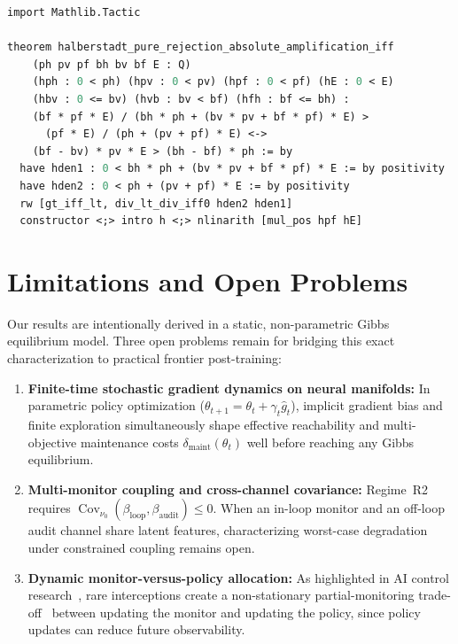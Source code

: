 \documentclass[11pt,a4paper]{article}
\newcommand{\Cov}{\operatorname{Cov}}
\begin{document}
\begin{lstlisting}[language=ML]
import Mathlib.Tactic

theorem halberstadt_pure_rejection_absolute_amplification_iff
    (ph pv pf bh bv bf E : Q)
    (hph : 0 < ph) (hpv : 0 < pv) (hpf : 0 < pf) (hE : 0 < E)
    (hbv : 0 <= bv) (hvb : bv < bf) (hfh : bf <= bh) :
    (bf * pf * E) / (bh * ph + (bv * pv + bf * pf) * E) >
      (pf * E) / (ph + (pv + pf) * E) <->
    (bf - bv) * pv * E > (bh - bf) * ph := by
  have hden1 : 0 < bh * ph + (bv * pv + bf * pf) * E := by positivity
  have hden2 : 0 < ph + (pv + pf) * E := by positivity
  rw [gt_iff_lt, div_lt_div_iff0 hden2 hden1]
  constructor <;> intro h <;> nlinarith [mul_pos hpf hE]
\end{lstlisting}

\section{Limitations and Open Problems}

Our results are intentionally derived in a static, non-parametric Gibbs equilibrium model. Three open problems remain for bridging this exact characterization to practical frontier post-training:
\begin{enumerate}
  \item \textbf{Finite-time stochastic gradient dynamics on neural manifolds:} In parametric policy optimization ($\theta_{t+1} = \theta_t + \gamma_t \hat{g}_t$), implicit gradient bias and finite exploration simultaneously shape effective reachability and multi-objective maintenance costs $\delta_{\mathrm{maint}}(\theta_t)$ well before reaching any Gibbs equilibrium.
  \item \textbf{Multi-monitor coupling and cross-channel covariance:} Regime~R2 requires $\Cov_{\nu_0}(\beta_{\mathrm{loop}}, \beta_{\mathrm{audit}}) \le 0$. When an in-loop monitor and an off-loop audit channel share latent features, characterizing worst-case degradation under constrained coupling remains open.
  \item \textbf{Dynamic monitor-versus-policy allocation:} As highlighted in AI control research~\cite{ukaisi2025}, rare interceptions create a non-stationary partial-monitoring trade-off~\cite{bartok2014} between updating the monitor and updating the policy, since policy updates can reduce future observability.
\end{enumerate}
\end{document}
